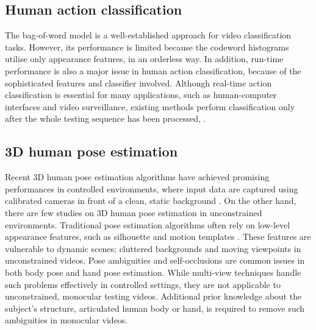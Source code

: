 \subsection{Human action classification}


The bag-of-word model is a well-established approach for video classification tasks. However, its performance is limited because the codeword histograms utilise only appearance features, in an orderless way. In addition, run-time performance is also a major issue in human action classification, because of the sophisticated features and classifier involved. Although real-time action classification is essential for many applications, such as human-computer interfaces and video surveillance, existing methods perform classification only after the whole testing sequence has been processed, \eg \cite{Schuldt2004, Dollar2005, Riemenschneider2009, Niebles2008, Wong2007}. 

\subsection{3D human pose estimation} 


Recent 3D human pose estimation algorithms have achieved promising performances in controlled environments, where input data are captured using calibrated cameras in front of a clean, static background \cite{Rogez2012, Pons-Moll2011, Sigal2012}. 
On the other hand, there are few studies on 3D human pose estimation in unconstrained environments.  
Traditional pose estimation algorithms often rely on low-level appearance features, such as silhouette and motion templates \cite{Bissacco2007, Rogez2012, Ionescu2011, Navaratnam2006}. These features are vulnerable to dynamic scenes; cluttered backgrounds and moving viewpoints in unconstrained videos. 
Pose ambiguities and self-occlusions are common issues in both body pose and hand pose estimation. While multi-view techniques handle such problems effectively in controlled settings, they are not applicable to unconstrained, monocular testing videos. Additional prior knowledge about the subject's structure, \eg articulated human body or hand, is required to remove such ambiguities in monocular videos. 

